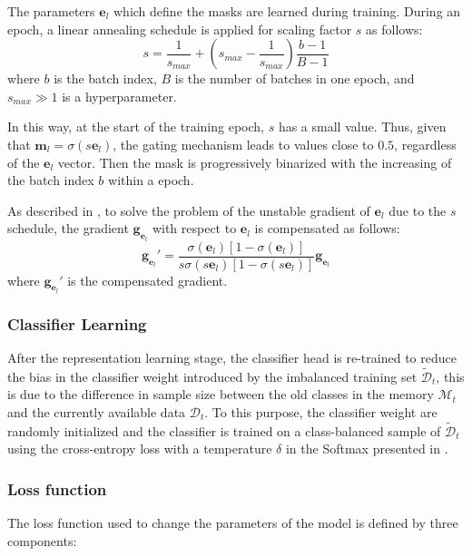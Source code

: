 The parameters $\textbf{e}_l$ which define the masks are learned during training. During an epoch, a linear annealing schedule is applied for scaling factor $s$ as follows:
\begin{equation}
    s = \frac{1}{s_{max}} + (s_{max}- \frac{1}{s_{max}}) \frac{b-1}{B-1}
\end{equation}
where $b$ is the batch index, $B$ is the number of batches in one epoch, and $s_{max} \gg 1$ is a hyperparameter.

In this way, at the start of the training epoch, $s$ has a small value. Thus, given that $\textbf{m}_l=\sigma(s \textbf{e}_l)$, the gating mechanism leads to values close to $0.5$, regardless of the $\textbf{e}_l$ vector. Then the mask is progressively binarized with the increasing of the batch index $b$ within a epoch.

As described in \cite{serra2018overcoming}, to solve the problem of the unstable gradient of $\textbf{e}_l$ due to the $s$ schedule, the gradient $\textbf{g}_{\textbf{e}_l}$ with respect to $\textbf{e}_l$ is compensated as follows:
\begin{equation}
    \textbf{g}_{\textbf{e}_l} ' = \frac{\sigma(\textbf{e}_l)[1-\sigma(\textbf{e}_l)]}{s\sigma(s\textbf{e}_l)[1-\sigma(s\textbf{e}_l)]}\textbf{g}_{\textbf{e}_l}
\end{equation}
where $\textbf{g}_{\textbf{e}_l} '$ is the compensated gradient.


\subsubsection{Classifier Learning}
After the representation learning stage, the classifier head is re-trained to reduce the bias in the classifier weight introduced by the imbalanced training set $\tilde{\mathcal{D}}_t$, this is due to the difference in sample size between the old classes in the memory $\mathcal{M}_t$ and the currently available data $\mathcal{D}_t$. To this purpose, the classifier weight are randomly initialized and the classifier is trained on a class-balanced sample of $\tilde{\mathcal{D}}_t$ using the cross-entropy loss with a temperature $\delta$ in the Softmax presented in \cite{zhao2020maintaining}. 

\subsubsection{Loss function}
The loss function used to change the parameters of the model is defined by three components:


